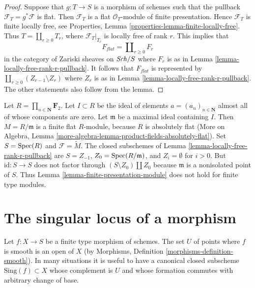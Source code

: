 \begin{proof}
Suppose that $g : T \to S$ is a morphism of schemes such that the pullback
$\mathcal{F}_T = g^*\mathcal{F}$ is flat. Then $\mathcal{F}_T$ is a flat
$\mathcal{O}_T$-module of finite presentation. Hence
$\mathcal{F}_T$ is finite locally free, see
Properties, Lemma \ref{properties-lemma-finite-locally-free}.
Thus $T = \coprod_{r \geq 0} T_r$, where $\mathcal{F}_T|_{T_r}$ is locally
free of rank $r$. This implies that
$$
F_{flat} = \coprod\nolimits_{r \geq 0} F_r
$$
in the category of Zariski sheaves on $\mathit{Sch}/S$ where $F_r$ is as in
Lemma \ref{lemma-locally-free-rank-r-pullback}. It follows
that $F_{flat}$ is represented by
$\coprod_{r \geq 0} (Z_{r - 1} \setminus Z_r)$ where
$Z_r$ is as in
Lemma \ref{lemma-locally-free-rank-r-pullback}.
The other statements also follow from the lemma.
\end{proof}

\begin{example}
\label{example-not-fp-MB}
Let $R = \prod_{n \in \mathbf{N}} \mathbf{F}_2$. Let $I \subset R$
be the ideal of elements $a = (a_n)_{n \in \mathbf{N}}$ almost all of whose
components are zero. Let $\mathfrak m$ be a maximal ideal containing $I$. 
Then $M = R/\mathfrak m$ is a finite flat $R$-module, because $R$ is absolutely
flat (More on Algebra, Lemma
\ref{more-algebra-lemma-product-fields-absolutely-flat}).
Set $S = \mathop{\mathrm{Spec}}(R)$ and $\mathcal{F} = \widetilde{M}$.
The closed subschemes of Lemma \ref{lemma-locally-free-rank-r-pullback} are
$S = Z_{-1}$, $Z_0 = \mathop{\mathrm{Spec}}(R/\mathfrak m)$, and $Z_i = \emptyset$ for $i > 0$.
But $\text{id} : S \to S$ does not factor through
$(S \setminus Z_0) \amalg Z_0$ because $\mathfrak m$ is a nonisolated
point of $S$. Thus
Lemma \ref{lemma-finite-presentation-module}
does not hold for finite type modules.
\end{example}







\section{The singular locus of a morphism}
\label{section-singular-locus-morphism}

\noindent
Let $f : X \to S$ be a finite type morphism of schemes. The set $U$ of points
where $f$ is smooth is an open of $X$
(by Morphisms, Definition \ref{morphisms-definition-smooth}).
In many situations it is useful to have a canonical closed
subscheme $\text{Sing}(f) \subset X$ whose complement is $U$
and whose formation commutes with arbitrary change of base.

